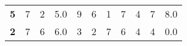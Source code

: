 {\begin{tabular}{ c | *{5}{>{\centering\arraybackslash}p{3cm}}}
 { \textbf{5}} & { 7}                                                                                                      & { 2}                                                                                            & { 5.0}                                                                                   & { 9}                                                                                                            & { 6}                                                                                                                    & { 1}                                                                                                      & { 7}                                                                                                             & { 4}                                                                                           & { 7}                                                                                          & { 8.0}                                                                                                                        \\
 { \textbf{2}} & { 7}                                                                                                      & { 6}                                                                                            & { 6.0}                                                                                   & { 3}                                                                                                            & { 2}                                                                                                                    & { 7}                                                                                                      & { 6}                                                                                                             & { 4}                                                                                           & { 4}                                                                                          & { 0.0}                                                                                                                        \\

\end{tabular}}
